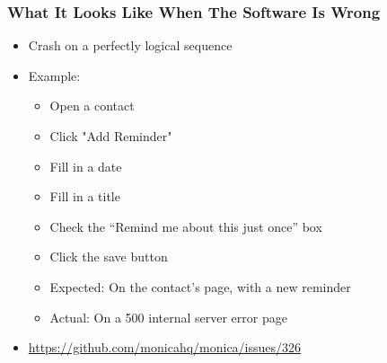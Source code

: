\begin{frame}
  \frametitle{What It Looks Like When The Software Is Wrong}
  \begin{itemize}
    \item Crash on a perfectly logical sequence
    \item Example:
    \begin{itemize}
      \item Open a contact
      \item Click "Add Reminder"
      \item Fill in a date
      \item Fill in a title
      \item Check the ``Remind me about this just once'' box
      \item Click the save button
      \item Expected: On the contact's page, with a new reminder
      \item Actual: On a 500 internal server error page
    \end{itemize}
    \item \url{https://github.com/monicahq/monica/issues/326}
  \end{itemize}
\end{frame}
